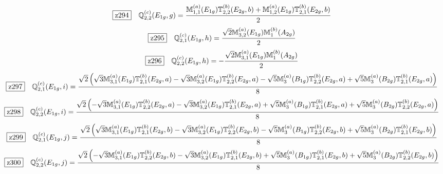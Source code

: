 \documentclass[fleqn,10pt,landscape]{jsarticle}
\begin{document}
\begin{dmath*}
\hspace*{3mm}\fbox{z294}\quad \mathbb{Q}_{2,2}^{(c)}(E_{1g},g)=\frac{\mathbb{M}_{1,1}^{(a)}(E_{1g}) \mathbb{T}_{2,2}^{(b)}(E_{2g},b) + \mathbb{M}_{1,2}^{(a)}(E_{1g}) \mathbb{T}_{2,1}^{(b)}(E_{2g},b)}{2}
\end{dmath*}
\begin{dmath*}
\hspace*{3mm}\fbox{z295}\quad \mathbb{Q}_{2,1}^{(c)}(E_{1g},h)=\frac{\sqrt{2} \mathbb{M}_{3,2}^{(a)}(E_{1g}) \mathbb{M}_{1}^{(b)}(A_{2g})}{2}
\end{dmath*}
\begin{dmath*}
\hspace*{3mm}\fbox{z296}\quad \mathbb{Q}_{2,2}^{(c)}(E_{1g},h)=- \frac{\sqrt{2} \mathbb{M}_{3,1}^{(a)}(E_{1g}) \mathbb{M}_{1}^{(b)}(A_{2g})}{2}
\end{dmath*}
\begin{dmath*}
\hspace*{3mm}\fbox{z297}\quad \mathbb{Q}_{2,1}^{(c)}(E_{1g},i)=\frac{\sqrt{2} \left(\sqrt{3} \mathbb{M}_{3,1}^{(a)}(E_{1g}) \mathbb{T}_{2,1}^{(b)}(E_{2g},a) - \sqrt{3} \mathbb{M}_{3,2}^{(a)}(E_{1g}) \mathbb{T}_{2,2}^{(b)}(E_{2g},a) - \sqrt{5} \mathbb{M}_{3}^{(a)}(B_{1g}) \mathbb{T}_{2,2}^{(b)}(E_{2g},a) + \sqrt{5} \mathbb{M}_{3}^{(a)}(B_{2g}) \mathbb{T}_{2,1}^{(b)}(E_{2g},a)\right)}{8}
\end{dmath*}
\begin{dmath*}
\hspace*{3mm}\fbox{z298}\quad \mathbb{Q}_{2,2}^{(c)}(E_{1g},i)=\frac{\sqrt{2} \left(- \sqrt{3} \mathbb{M}_{3,1}^{(a)}(E_{1g}) \mathbb{T}_{2,2}^{(b)}(E_{2g},a) - \sqrt{3} \mathbb{M}_{3,2}^{(a)}(E_{1g}) \mathbb{T}_{2,1}^{(b)}(E_{2g},a) + \sqrt{5} \mathbb{M}_{3}^{(a)}(B_{1g}) \mathbb{T}_{2,1}^{(b)}(E_{2g},a) + \sqrt{5} \mathbb{M}_{3}^{(a)}(B_{2g}) \mathbb{T}_{2,2}^{(b)}(E_{2g},a)\right)}{8}
\end{dmath*}
\begin{dmath*}
\hspace*{3mm}\fbox{z299}\quad \mathbb{Q}_{2,1}^{(c)}(E_{1g},j)=\frac{\sqrt{2} \left(\sqrt{3} \mathbb{M}_{3,1}^{(a)}(E_{1g}) \mathbb{T}_{2,1}^{(b)}(E_{2g},b) - \sqrt{3} \mathbb{M}_{3,2}^{(a)}(E_{1g}) \mathbb{T}_{2,2}^{(b)}(E_{2g},b) - \sqrt{5} \mathbb{M}_{3}^{(a)}(B_{1g}) \mathbb{T}_{2,2}^{(b)}(E_{2g},b) + \sqrt{5} \mathbb{M}_{3}^{(a)}(B_{2g}) \mathbb{T}_{2,1}^{(b)}(E_{2g},b)\right)}{8}
\end{dmath*}
\begin{dmath*}
\hspace*{3mm}\fbox{z300}\quad \mathbb{Q}_{2,2}^{(c)}(E_{1g},j)=\frac{\sqrt{2} \left(- \sqrt{3} \mathbb{M}_{3,1}^{(a)}(E_{1g}) \mathbb{T}_{2,2}^{(b)}(E_{2g},b) - \sqrt{3} \mathbb{M}_{3,2}^{(a)}(E_{1g}) \mathbb{T}_{2,1}^{(b)}(E_{2g},b) + \sqrt{5} \mathbb{M}_{3}^{(a)}(B_{1g}) \mathbb{T}_{2,1}^{(b)}(E_{2g},b) + \sqrt{5} \mathbb{M}_{3}^{(a)}(B_{2g}) \mathbb{T}_{2,2}^{(b)}(E_{2g},b)\right)}{8}
\end{dmath*}
\end{document}
